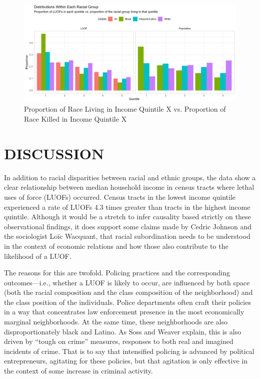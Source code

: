 \documentclass[12pt]{article}
\begin{document}
\begin{figure}[H]
  \centering
  \includegraphics[width=\linewidth]{images/inc_and_race_victim_shape_bar}
  \captionsetup{justification=centering, singlelinecheck=false, margin=2cm}
  \caption{Proportion of Race Living in Income Quintile X vs. Proportion of Race Killed in Income Quintile X}
  \label{fig:inc_and_race_victim_shape_bar}
\end{figure}

\section{DISCUSSION}

In addition to racial disparities between racial and ethnic groups, the data show a clear relationship between median household income in census tracts where lethal uses of force (LUOFs) occurred. Census tracts in the lowest income quintile experienced a rate of LUOFs 4.3 times greater than tracts in the highest income quintile. Although it would be a stretch to infer causality based strictly on these observational findings, it does support some claims made by Cedric Johnson and the sociologist Loïc Wacquant, that racial subordination needs to be understood in the context of economic relations and how those also contribute to the likelihood of a LUOF.

The reasons for this are twofold. Policing practices and the corresponding outcomes—i.e., whether a LUOF is likely to occur, are influenced by both space (both the racial composition and the class composition of the neighborhood) and the class position of the individuals. Police departments often craft their policies in a way that concentrates law enforcement presence in the most economically marginal neighborhoods. At the same time, these neighborhoods are also disproportionately black and Latino. As Soss and Weaver explain, this is also driven by “tough on crime” measures, responses to both real and imagined incidents of crime. That is to say that intensified policing is advanced by political entrepreneurs, agitating for these policies, but that agitation is only effective in the context of some increase in criminal activity.
\end{document}
